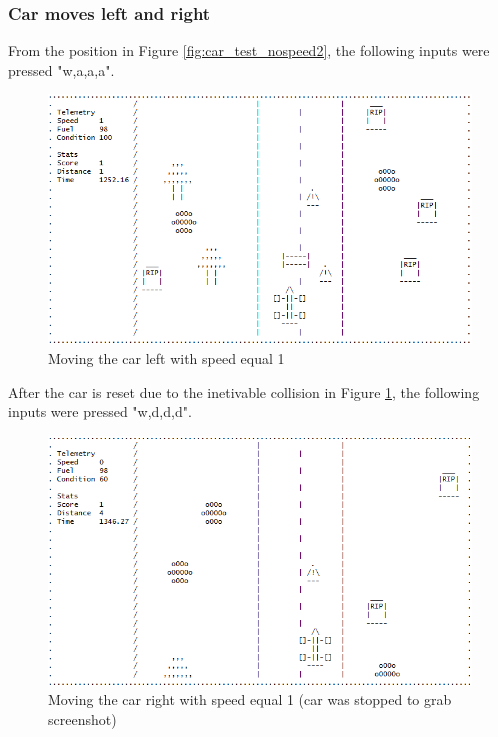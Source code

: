 \documentclass{article}
\begin{document}
\subsubsection*{Car moves left and right}
From the position in Figure \ref{fig:car_test_nospeed2}, the following inputs were pressed "w,a,a,a".
\begin{figure}[!ht]
	\begin{center}
	\includegraphics[width=0.667\paperwidth]{images/car_test_moveleft}
	\caption{Moving the car left with speed equal 1}
	\label{fig:car_test_moveleft} 
	\end{center}
\end{figure}
\newline
After the car is reset due to the inetivable collision in Figure \ref{fig:car_test_moveleft}, the following inputs were pressed "w,d,d,d". 
\begin{figure}[!ht]
	\begin{center}
	\includegraphics[width=0.667\paperwidth]{images/car_test_moveright}
	\caption{Moving the car right with speed equal 1 (car was stopped to grab screenshot)}
	\label{fig:car_test_moveright} 
	\end{center}
\end{figure}
\newpage
\end{document}
